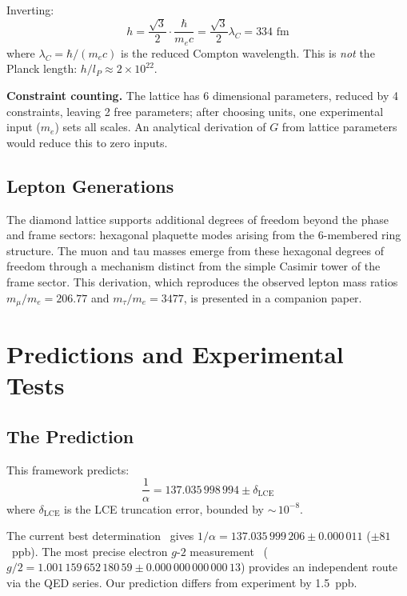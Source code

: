 \documentclass[aps,prd,onecolumn,superscriptaddress,floatfix,12pt]{revtex4-2}
\begin{document}
Inverting:
\begin{equation}\label{eq:lattice-spacing}
h = \frac{\sqrt{3}}{2} \cdot \frac{\hbar}{m_e c} = \frac{\sqrt{3}}{2} \lambda_C = 334 \text{ fm}
\end{equation}
where $\lambda_C = \hbar/(m_e c)$ is the reduced Compton wavelength. This is \emph{not} the Planck length: $h/l_P \approx 2 \times 10^{22}$.

\textbf{Constraint counting.} The lattice has 6 dimensional parameters, reduced by 4 constraints, leaving 2 free parameters; after choosing units, one experimental input ($m_e$) sets all scales. An analytical derivation of $G$ from lattice parameters would reduce this to zero inputs.

\subsection{Lepton Generations}\label{sec:6-2}

The diamond lattice supports additional degrees of freedom beyond the phase and frame sectors: hexagonal plaquette modes arising from the 6-membered ring structure. The muon and tau masses emerge from these hexagonal degrees of freedom through a mechanism distinct from the simple Casimir tower of the frame sector. This derivation, which reproduces the observed lepton mass ratios $m_\mu/m_e = 206.77$ and $m_\tau/m_e = 3477$, is presented in a companion paper.

\section{Predictions and Experimental Tests}\label{sec:7}

\subsection{The Prediction}\label{sec:7-1}

This framework predicts:
\begin{equation}\label{eq:prediction}
\frac{1}{\alpha} = 137.035\,998\,994 \pm \delta_{\text{LCE}}
\end{equation}
where $\delta_{\text{LCE}}$ is the LCE truncation error, bounded by ${\sim}\,10^{-8}$.

The current best determination~\cite{Morel2020} gives $1/\alpha = 137.035\,999\,206 \pm 0.000\,011$ ($\pm 81$~ppb). The most precise electron $g\text{-}2$ measurement~\cite{Fan2023} ($g/2 = 1.001\,159\,652\,180\,59 \pm 0.000\,000\,000\,000\,13$) provides an independent route via the QED series. Our prediction differs from experiment by 1.5~ppb.
\end{document}
